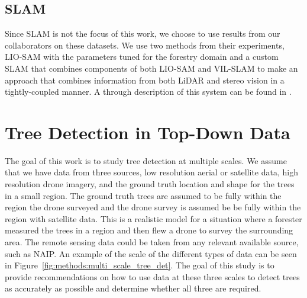 \subsection{SLAM}    
Since SLAM is not the focus of this work, we choose to use results from our collaborators on these datasets. We use two methods from their experiments, LIO-SAM \cite{Shan2020LIO-SAM:Mapping} with the parameters tuned for the forestry domain and a custom SLAM that combines components of both LIO-SAM and VIL-SLAM \cite{Shao2019StereoMapping} to make an approach that combines information from both LiDAR and stereo vision in a tightly-coupled manner. A through description of this system can be found in \cite{RussellUnmannedMitigation}.

\section{Tree Detection in Top-Down Data}
The goal of this work is to study tree detection at multiple scales. We assume that we have data from three sources, low resolution aerial or satellite data, high resolution drone imagery, and the ground truth location and shape for the trees in a small region. The ground truth trees are assumed to be fully within the region the drone surveyed and the drone survey is assumed be be fully within the region with satellite data. This is a realistic model for a situation where a forester measured the trees in a region and then flew a drone to survey the surrounding area. The remote sensing data could be taken from any relevant available source, such as NAIP. An example of the scale of the different types of data can be seen in Figure~\ref{fig:methods:multi_scale_tree_det}. The goal of this study is to provide recommendations on how to use data at these three scales to detect trees as accurately as possible and determine whether all three are required. 

